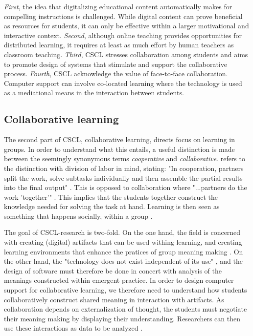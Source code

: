 \emph{First}, the idea that digitalizing educational content automatically makes for compelling instructions is challenged. While digital content can prove beneficial as resources for students, it can only be effective within a larger motivational and interactive context. \emph{Second}, although online teaching provides opportunities for distributed learning, it requires at least as much effort by human teachers as classroom teaching. \emph{Third}, CSCL stresses collaboration among students and aims to promote design of systems that stimulate and support the collaborative process. \emph{Fourth}, CSCL acknowledge the value of face-to-face collaboration. Computer support can involve co-located learning where the technology is used as a mediational means in the interaction between students.

\subsection{Collaborative learning}
The second part of CSCL, collaborative learning, directs focus on learning in groups. In order to understand what this entails, a useful distinction is made between the seemingly synonymous terms \emph{cooperative} and \emph{collaborative}. \citet*{dillenbourg1999you} refers to the distinction with division of labor in mind, stating: "In cooperation, partners split the work, solve subtasks individually and then assemble the partial results into the final output" \citep[p. 8]{dillenbourg1999you}. This is opposed to collaboration where "...partners do the work 'together'" \citep{dillenbourg1999you}. This implies that the students together construct the knowledge needed for solving the task at hand. Learning is then seen as something that happens socially, within a group \citep{stahl2006computer}. 

The goal of CSCL-research is two-fold. On the one hand, the field is concerned with creating (digital) artifacts that can be used withing learning, and creating learning environments that enhance the pratices of group meaning making \citep{stahl2006computer}. On the other hand, the "technology does not exist independent of its use" \citep[\citealp{LeBaron2002} referenced in][]{stahl2006computer}, and the design of software must therefore be done in concert with analysis of the meanings constructed within emergent practice. In order to design computer support for collaborative learning, we therefore need to understand how students collaboratively construct shared meaning in interaction with artifacts. As collaboration depends on externalization of thought, the students must negotiate their meaning making by displaying their understanding. Researchers can then use these interactions as data to be analyzed \citep{stahl2006computer}.

